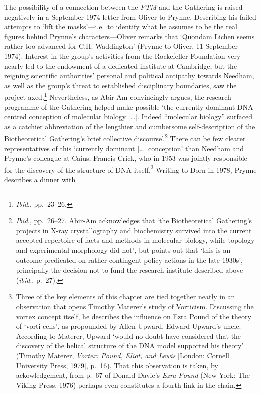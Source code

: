 \documentclass[]{article}
\begin{document}
The possibility of a connection between the \emph{PTM} and the Gathering
is raised negatively in a September 1974 letter from Oliver to Prynne.
Describing his failed attempts to ‘lift the masks’—i.e.~to identify what
he assumes to be the real figures behind Prynne’s characters—Oliver
remarks that ‘Quondam Lichen seems rather too advanced for C.H.
Waddington’ (Prynne to Oliver, 11 September 1974). Interest in the
group’s activities from the Rockefeller Foundation very nearly led to
the endowment of a dedicated institute at Cambridge, but the reigning
scientific authorities’ personal and political antipathy towards
Needham, as well as the group’s threat to established disciplinary
boundaries, saw the project axed.\footnote{\emph{Ibid}., pp.~23–26.}
Nevertheless, as Abir-Am convincingly argues, the research programme of
the Gathering helped make possible ‘the currently dominant DNA-centred
conception of molecular biology {[}\ldots{}{]}. Indeed “molecular
biology” surfaced as a catchier abbreviation of the lengthier and
cumbersome self-description of the Biotheoretical Gathering’s brief
collective discourse’.\footnote{\emph{Ibid}., pp.~26–27. Abir-Am
  acknowledges that ‘the Biotheoretical Gathering’s projects in X-ray
  crystallography and biochemistry survived into the current accepted
  repertoire of facts and methods in molecular biology, while topology
  and experimental morphology did not’, but points out that ‘this is an
  outcome predicated on rather contingent policy actions in the late
  1930s’, principally the decision not to fund the research institute
  described above (\emph{ibid}., p.~27).} There can be few clearer
representatives of this ‘currently dominant {[}\ldots{}{]} conception’
than Needham and Prynne’s colleague at Caius, Francis Crick, who in 1953
was jointly responsible for the discovery of the structure of DNA
itself.\footnote{Three of the key elements of this chapter are tied
  together neatly in an observation that opens Timothy Materer’s study
  of Vorticism. Discussing the vortex concept itself, he describes the
  influence on Ezra Pound of the theory of ‘vorti-cells’, as propounded
  by Allen Upward, Edward Upward’s uncle. According to Materer, Upward
  ‘would no doubt have considered that the discovery of the helical
  structure of the DNA model supported his theory’ (Timothy Materer,
  \emph{Vortex: Pound, Eliot, and Lewis} {[}London: Cornell University
  Press, 1979{]}, p.~16). That this observation is taken, by
  ackowledgement, from p.~67 of Donald Davie’s \emph{Ezra Pound} (New
  York: The Viking Press, 1976) perhaps even constitutes a fourth link
  in the chain.} Writing to Dorn in 1978, Prynne describes a dinner with
\end{document}
